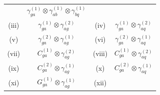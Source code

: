 \documentclass[12pt]{article}
\begin{document}
\begin{appendix}
\begin{table}
\begin{center}
\begin{tabular}{ |c|c||c|c| }
& $\gamma^{(1)}_{ga}\otimes\gamma^{(1)}_{ab}\otimes\gamma^{(1)}_{bq}$  \\

\multirow{1}{*}{(iii)} 

& $\gamma^{(1)}_{ga}\otimes\gamma^{(2)}_{ag}$

& \multirow{1}{*}{(iv)} 

& $\gamma^{(1)}_{ga}\otimes\gamma^{(2)}_{aq}$  \\
\multirow{1}{*}{(v)} 

& $\gamma^{(2)}_{ga}\otimes\gamma^{(1)}_{ag}$

& \multirow{1}{*}{(vi)} 

& $\gamma^{(2)}_{ga}\otimes\gamma^{(1)}_{aq}$  \\
\multirow{1}{*}{(vii)} 

& $C^{(1)}_{ga}\otimes\gamma^{(2)}_{ag}$

& \multirow{1}{*}{(viii)} 

& $C^{(1)}_{ga}\otimes\gamma^{(2)}_{aq}$  \\
\multirow{1}{*}{(ix)} 

& $C^{(2)}_{ga}\otimes\gamma^{(1)}_{ag}$

& \multirow{1}{*}{(x)} 

& $C^{(2)}_{ga}\otimes\gamma^{(1)}_{aq}$  \\
\multirow{1}{*}{(xi)} 

& $G^{(1)}_{ga}\otimes\gamma^{(1)}_{ag}$

& \multirow{1}{*}{(xii)} 


\end{tabular}
\end{center}
\end{table}
\end{appendix}
\end{document}
